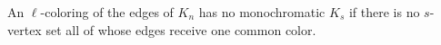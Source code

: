 \begin{definition}
An \(\ell\)-coloring of the edges of \(K_n\) has no monochromatic \(K_s\) if there is no \(s\)-vertex set all of whose edges receive one common color.
\end{definition}
